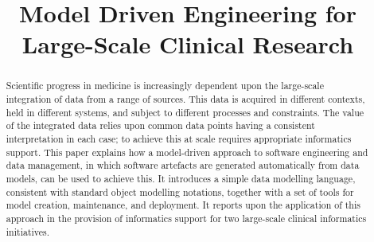 \documentclass[conference]{IEEEtran}
\begin{document}
 

\title{Model Driven Engineering for \\ Large-Scale Clinical Research}

\vskip 4mm 

\author{%
}

\ifpdf
\graphicspath{{ASEFigs/}}
\fi

\maketitle

\begin{abstract}
  Scientific progress in medicine is increasingly dependent upon the
  large-scale integration of data from a range of sources.  This data
  is acquired in different contexts, held in different systems, and
  subject to different processes and constraints.  The value of the
  integrated data relies upon common data points having a consistent
  interpretation in each case; to achieve this at scale requires
  appropriate informatics support.  This paper explains how a
  model-driven approach to software engineering and data management,
  in which software artefacts are generated automatically from data
  models, can be used to achieve this.  It introduces a simple data
  modelling language, consistent with standard object modelling
  notations, together with a set of tools for model creation,
  maintenance, and deployment.  It reports upon the application of
  this approach in the provision of informatics support for two
  large-scale clinical informatics initiatives.
\end{abstract}

% 


\vskip 14mm

\noindent






 


\newpage




\end{document}

